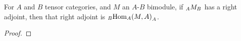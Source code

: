 \documentclass{amsart}
\begin{document}
\begin{corollary}
For $A$ and $B$ tensor categories, and $M$ an $A$-$B$ bimodule, if ${}_{A} {M}_{B}$ has a right adjoint, then that right adjoint is ${}_{B} {\operatorname{Hom}_A(M,A)}_{A}$.
\end{corollary}

\begin{proof}
\end{proof}







\end{document}

